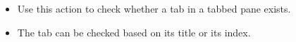 
\begin{itemize}
\item Use this action to check whether a tab in a tabbed pane exists. 
\item The tab can be checked based on its title or its index.
\end{itemize}
